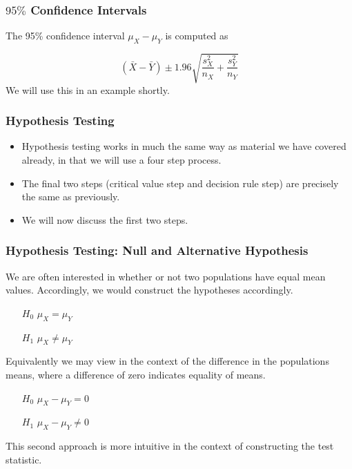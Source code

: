 \begin{frame}
\frametitle{$95\%$ Confidence Intervals}
The 95\% confidence interval $\mu_X - \mu_Y$ is computed as

\[ (\bar{X} - \bar{Y}) \pm 1.96 \sqrt{\frac{s^2_X}{n_X} + \frac{s^2_Y}{n_Y}}\]
We will use this in an example shortly.
\end{frame}
\begin{frame}
\frametitle{Hypothesis Testing}
\begin{itemize}
\item Hypothesis testing works in much the same way as material we have covered already, in that we will use a four step process.
\item The final two steps (critical value step and decision rule step) are precisely the same as previously.
\item We will now discuss the first two steps.
\end{itemize}
\end{frame}


\begin{frame}
\frametitle{Hypothesis Testing: Null and Alternative Hypothesis}
We are often interested in whether or not two populations have equal mean values. Accordingly, we would construct the hypotheses accordingly.
\begin{itemize}
\item[$H_0$] $\mu_X = \mu_Y$
\item[$H_1$] $\mu_X \neq \mu_Y$
\end{itemize}

Equivalently we may view in the context of the difference in the populations means, where a difference of zero indicates equality of means.
\begin{itemize}
\item[$H_0$] $\mu_X - \mu_Y = 0$
\item[$H_1$] $\mu_X - \mu_Y \neq 0$
\end{itemize}
This second approach is more intuitive in the context of constructing the test statistic.
\end{frame}

